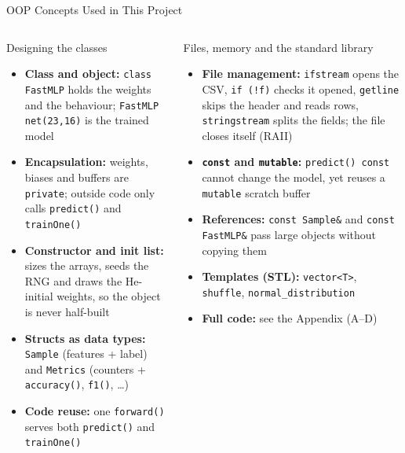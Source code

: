 \documentclass[aspectratio=169]{beamer}
\newenvironment{eq}[1]{\begin{minipage}[t][#1][t]{\linewidth}\raggedright\hyphenpenalty=10000 }{\end{minipage}}
\begin{document}
\begin{frame}{OOP Concepts Used in This Project}
  \begin{columns}[T]
      \begin{block}{\small Designing the classes}
\begin{eq}{4.35cm}
        \scriptsize
        \begin{itemize}
          \item \textbf{Class and object:} \texttt{class FastMLP} holds the weights and the behaviour; \texttt{FastMLP net(23,16)} is the trained model
          \item \textbf{Encapsulation:} weights, biases and buffers are \texttt{private}; outside code only calls \texttt{predict()} and \texttt{trainOne()}
          \item \textbf{Constructor and init list:} sizes the arrays, seeds the RNG and draws the He-initial weights, so the object is never half-built
          \item \textbf{Structs as data types:} \texttt{Sample} (features + label) and \texttt{Metrics} (counters + \texttt{accuracy()}, \texttt{f1()}, \ldots)
          \item \textbf{Code reuse:} one \texttt{forward()} serves both \texttt{predict()} and \texttt{trainOne()}
        \end{itemize}
      \end{eq}
      \end{block}
      \begin{block}{\small Files, memory and the standard library}
\begin{eq}{4.35cm}
        \scriptsize
        \begin{itemize}
          \item \textbf{File management:} \texttt{ifstream} opens the CSV, \texttt{if (!f)} checks it opened, \texttt{getline} skips the header and reads rows, \texttt{stringstream} splits the fields; the file closes itself (RAII)
          \item \textbf{\texttt{const} and \texttt{mutable}:} \texttt{predict() const} cannot change the model, yet reuses a \texttt{mutable} scratch buffer
          \item \textbf{References:} \texttt{const Sample\&} and \texttt{const FastMLP\&} pass large objects without copying them
          \item \textbf{Templates (STL):} \texttt{vector<T>}, \texttt{shuffle}, \texttt{normal\_distribution}
          \item \textbf{Full code:} see the Appendix (A--D)
        \end{itemize}
      \end{eq}
      \end{block}
  \end{columns}


\end{frame}
\end{document}
